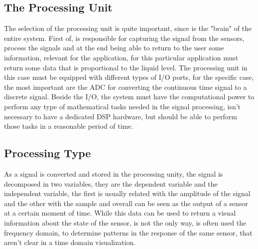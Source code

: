 \subsection*{The Processing Unit}
The selection of the processing unit is quite important, since is the "brain" of the entire system. First of, is responsible for capturing the signal from the sensors, process the signals and at the end being able to return to the user some information, relevant for the application, for this particular application must return some data that is proportional to the liquid level. The processing unit in this case must be equipped with different types of I/O ports, for the specific case, the most important are the ADC for converting the continuous time signal to a discrete signal. Beside the I/O, the system must have the computational power to perform any type of mathematical tasks needed in the signal processing, isn't necessary to have a dedicated DSP hardware, but should be able to perform those tasks in a reasonable period of time.  
\subsection*{Processing Type}
As a signal is converted and stored in the processing unity, the signal is decomposed in two variables, they are the dependent variable and the independent variable, the first is usually related with the amplitude of the signal and the other with the sample and overall can be seen as the output of a sensor at a certain moment of time. While this data can be used to return a visual information about the state of the sensor, is not the only way, is often used the frequency domain, to determine patterns in the response of the same sensor, that aren't clear in a time domain visualization.

